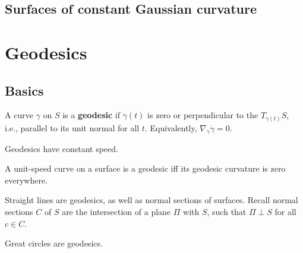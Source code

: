 \subsection{Surfaces of constant Gaussian curvature}

\section{Geodesics} 
\subsection{Basics}
\begin{definition}[]
    A curve $\gamma $ on $S$ is a \textbf{geodesic} if $\ddot \gamma (t)$ is zero or perpendicular to the $T_{\gamma (t)}S$, i.e., parallel to its unit normal for all $t$. Equivalently, $\nabla _{\dot\gamma }\dot \gamma =0$.
\end{definition}
\begin{prop}
    Geodesics have constant speed.
\end{prop}
\begin{prop}
    A unit-speed curve on a surface is a geodesic iff its geodesic curvature is zero everywhere.
\end{prop}
\begin{prop}
    Straight lines are geodesics, as well as normal sections of surfaces. Recall normal sections $C$ of $S$ are the intersection of a plane $\Pi$ with $S$, such that $\Pi\perp S$ for all $c \in C$.
\end{prop}
\begin{example}
    Great circles are geodesics.
\end{example}

